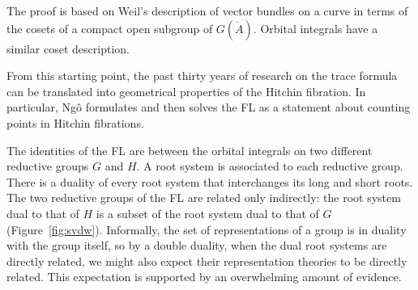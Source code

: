 The proof is based on Weil's description of vector bundles on a curve
in terms of the cosets of a compact open subgroup of $G(\ring{A})$. 
Orbital integrals have a similar coset description.

From this starting point, the past thirty years of research
on the trace formula can be translated into geometrical properties of
the Hitchin fibration.  In particular, Ng\^o formulates and then solves
the FL as a statement about counting points in Hitchin
fibrations.  

The identities of the FL are between the orbital integrals on two
different reductive groups $G$ and $H$.  A root system is associated
to each reductive group.  There is a duality of every root system that
interchanges its long and short roots.  The two reductive
groups of the FL are related
only indirectly: the root system dual to that of $H$ is a subset of
the root system dual to that of $G$ (Figure~\ref{fig:svdw}).  Informally, the set
of representations of a group is in duality with the group itself, so
by a double duality, when the dual root systems are directly related,
we might also expect their representation theories to be directly
related.  This expectation is supported by an overwhelming amount
of evidence.

